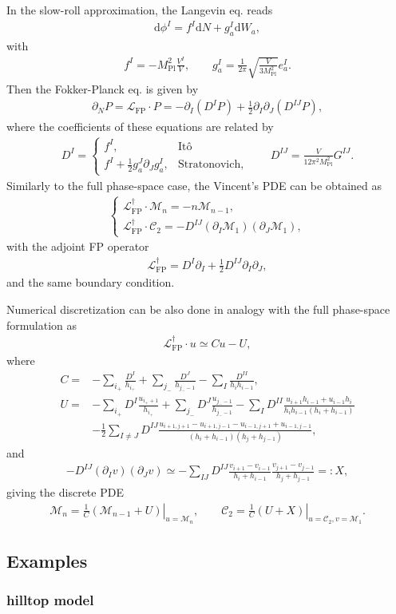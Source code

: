 \documentclass[aps, prd
, preprint
, nofootinbib 
, longbibliography
]{revtex4-1}
\newcommand{\dd}{\mathrm{d}}
\newcommand{\Mpl}{M_\text{Pl}}
\newcommand{\dps}{\displaystyle}
\newcommand{\FP}{\text{FP}}
\newcommand{\calC}{\mathcal{C}}
\newcommand{\calL}{\mathcal{L}}
\newcommand{\calM}{\mathcal{M}}
\newcommand{\bae}[1]{\begin{align} #1 \end{align}}
\newcommand{\bce}[1]{\begin{cases} #1 \end{cases}}
\begin{document}
In the slow-roll approximation, the Langevin eq. reads
\bae{
	\dd\phi^I=f^I\dd N+g^I_a\dd W_a,
}
with
\bae{
	f^I=-\Mpl^2\frac{V^I}{V}, \qquad g^I_a=\frac{1}{2\pi}\sqrt{\frac{V}{3\Mpl^2}}e^I_a.
}
Then the Fokker-Planck eq. is given by
\bae{
    \partial_NP=\calL_\FP\cdot P=-\partial_I(D^IP)+\frac{1}{2}\partial_I\partial_J(D^{IJ}P),
}
where the coefficients of these equations are related by
\bae{
    D^I=\bce{
        \dps
        f^I, & \text{It\^o} \\[10pt]
        \dps
        f^I+\frac{1}{2}g^J_a\partial_Jg^I_a, & \text{Stratonovich},
    }
    \qquad D^{IJ}=\frac{V}{12\pi^2\Mpl^2}G^{IJ}.
}
Similarly to the full phase-space case, the Vincent's PDE can be obtained as
\bae{
    \bce{
        \dps
        \calL_\FP^\dagger\cdot\calM_n=-n\calM_{n-1}, \\[10pt]
        \dps
        \calL_\FP^\dagger\cdot\calC_2=-D^{IJ}(\partial_I\calM_1)(\partial_J\calM_1),
    }
}
with the adjoint FP operator
\bae{
    \calL_\FP^\dagger=D^I\partial_I+\frac{1}{2}D^{IJ}\partial_I\partial_J,
}
and the same boundary condition.

Numerical discretization can be also done in analogy with the full phase-space formulation as
\bae{
    \calL_\FP^\dagger\cdot u\simeq Cu-U,
}
where
\bae{
    C=&-\sum_{i_+}\frac{D^I}{h_{i_+}}
    +\sum_{j_-}\frac{D^J}{h_{j_--1}}
    -\sum_I\frac{D^{II}}{h_ih_{i-1}}, \\
    U=&-\sum_{i_+}D^I\frac{u_{i_++1}}{h_{i_+}}
    +\sum_{j_-}D^J\frac{u_{j_--1}}{h_{j_--1}}
    -\sum_ID^{II}\frac{u_{i+1}h_{i-1}+u_{i-1}h_i}{h_ih_{i-1}(h_i+h_{i-1})} \nonumber \\
    &-\frac{1}{2}\sum_{I\neq J}D^{IJ}\frac{u_{i+1,j+1}-u_{i+1,j-1}-u_{i-1,j+1}+u_{i-1,j-1}}{(h_i+h_{i-1})(h_j+h_{j-1})},
}
and
\bae{
    -D^{IJ}(\partial_Iv)(\partial_Jv)
    \simeq-\sum_{IJ}D^{IJ}\frac{v_{i+1}-v_{i-1}}{h_i+h_{i-1}}
    \frac{v_{j+1}-v_{j-1}}{h_j+h_{j-1}}=:X,
}
giving the discrete PDE
\bae{
    \calM_n=\left.\frac{1}{C}(\calM_{n-1}+U)\right|_{u=\calM_n},
    \qquad \calC_2=\left.\frac{1}{C}(U+X)\right|_{u=\calC_2,v=\calM_1}.
}



\subsection{Examples}

\subsubsection{hilltop model}
\end{document}
